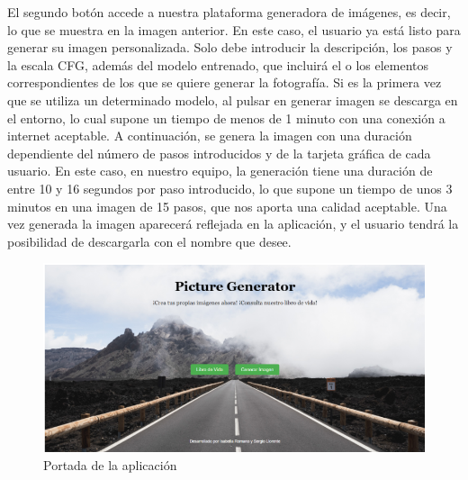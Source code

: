 El segundo botón accede a nuestra plataforma generadora de imágenes, es decir, lo que se muestra en la imagen anterior. En este caso, el usuario ya está listo para generar su imagen personalizada. Solo debe introducir la descripción, los pasos y la escala CFG, además del modelo entrenado, que incluirá el o los elementos correspondientes de los que se quiere generar la fotografía. Si es la primera vez que se utiliza un determinado modelo, al pulsar en generar imagen se descarga en el entorno, lo cual supone un tiempo de menos de 1 minuto con una conexión a internet aceptable. A continuación, se genera la imagen con una duración dependiente del número de pasos introducidos y de la tarjeta gráfica de cada usuario. En este caso, en nuestro equipo, la generación tiene una duración de entre 10 y 16 segundos por paso introducido, lo que supone un tiempo de unos 3 minutos en una imagen de 15 pasos, que nos aporta una calidad aceptable. Una vez generada la imagen aparecerá reflejada en la aplicación, y el usuario tendrá la posibilidad de descargarla con el nombre que desee.\\

\begin{figure}[!htb]
	\centering
	\includegraphics[width = 1
	\textwidth]{Imagenes/Vectorial/portadapp.png}
	\caption{Portada de la aplicación}
	\label{fig:portadapp}
\end{figure}
